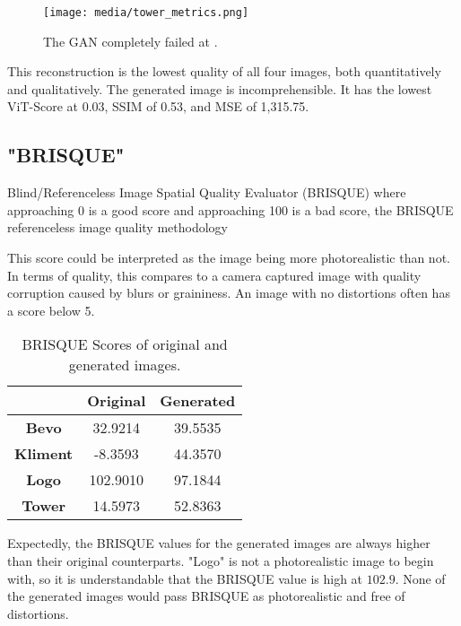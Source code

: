 \begin{figure}[H]
        \begin{center}
        \texttt{[image: media/tower\_metrics.png]}
        \end{center}
        \caption["Tower" Established Metrics]{The GAN completely failed at .}
        \end{figure}

This reconstruction is the lowest quality of all four images, both quantitatively and qualitatively.
The generated image is incomprehensible. It has the lowest ViT-Score at 0.03, SSIM of 0.53, and MSE of 1,315.75.

\subsection{"BRISQUE"}

Blind/Referenceless Image Spatial Quality Evaluator (BRISQUE)
where approaching 0 is a good score and approaching 100 is a bad score, the BRISQUE referenceless 
image quality methodology

This score could be interpreted as the image being more photorealistic than not. 
In terms of quality, this compares to a camera captured image with quality corruption 
caused by blurs or graininess. An image with no distortions often has a score below 5.

\begin{table}[H]
    \begin{center}
    \begin{tabular}{|c|c|c|}
    \hline
      & Original & Generated \\ [0.5ex] 
    \hline\hline
    \textbf{Bevo}	& 32.9214 & 39.5535\\
    \textbf{Kliment}	& -8.3593 & 44.3570\\
    \textbf{Logo}	& 102.9010 & 97.1844\\
    \textbf{Tower} & 14.5973 & 52.8363\\\hline
    
    \end{tabular}
    \caption[BRISQUE]{BRISQUE Scores of original and generated images.}
    \end{center}
    \end{table}

Expectedly, the BRISQUE values for the generated images are always higher than
their original counterparts. "Logo" is not a photorealistic image to begin with, 
so it is understandable that the BRISQUE value is high at $102.9$.
None of the generated images would pass BRISQUE as photorealistic and free of 
distortions.  

